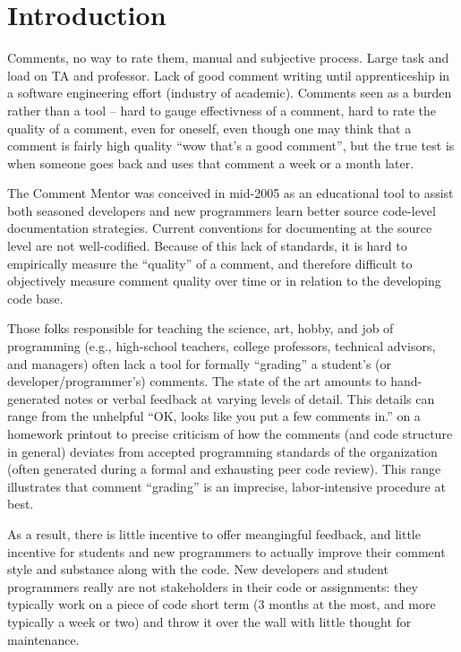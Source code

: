 \section{Introduction}
\label{sec:intro}

Comments, no way to rate them, manual and subjective process. Large task and
load on TA and professor. Lack of good comment writing until apprenticeship
in a software engineering effort (industry of academic). Comments seen as a
burden rather than a tool -- hard to gauge effectivness of a comment, hard
to rate the quality of a comment, even for oneself, even though one may
think that a comment is fairly high quality ``wow that's a good comment'',
but the true test is when someone goes back and uses that comment a week or
a month later.

The Comment Mentor was conceived in mid-2005 as an educational tool to
assist both seasoned developers and new programmers learn better
source code-level documentation strategies. Current conventions for
documenting at the source level are not well-codified. Because of this
lack of standards, it is hard to empirically measure the ``quality''
of a comment, and therefore difficult to objectively measure comment
quality over time or in relation to the developing code base.

Those folks responsible for teaching the science, art, hobby, and job
of programming (e.g., high-school teachers, college professors,
technical advisors, and managers) often lack a tool for formally
``grading'' a student's (or developer/programmer's) comments. The
state of the art amounts to hand-generated notes or verbal feedback at
varying levels of detail. This details can range from the unhelpful
``OK, looks like you put a few comments in.'' on a homework printout
to precise criticism of how the comments (and code structure in
general) deviates from accepted programming standards of the
organization (often generated during a formal and exhausting peer code
review). This range illustrates that comment ``grading'' is an
imprecise, labor-intensive procedure at best.

As a result, there is little incentive to offer meangingful feedback,
and little incentive for students and new programmers to actually
improve their comment style and substance along with the code. New
developers and student programmers really are not stakeholders in
their code or assignments: they typically work on a piece of code
short term (3 months at the most, and more typically a week or two)
and throw it over the wall with little thought for maintenance.

